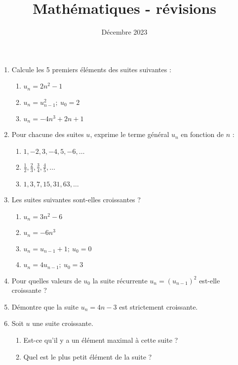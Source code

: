 

\title{Mathématiques - révisions}
\date{Décembre 2023}



	\maketitle

	\begin{enumerate}
		\item Calcule les 5 premiers éléments des suites suivantes :
		\begin{enumerate}
			\item $u_n = 2n^2 - 1$
			\item $u_n = u_{n-1}^2; ~ u_0 = 2$
			\item $u_n = -4n^3 + 2n + 1$
		\end{enumerate}
	
		\item Pour chacune des suites $u$, exprime le terme général $u_n$ en fonction de $n$ :
			\begin{enumerate}
				\item $1, -2, 3, -4, 5, -6, \dots$
				\item $\frac{1}{2}, \frac{2}{3}, \frac{3}{4}, \frac{4}{5}, \dots$
				\item $1, 3, 7, 15, 31, 63, \dots$
			\end{enumerate}
	
		\item Les suites suivantes sont-elles croissantes ?
			\begin{enumerate}
				\item $u_n = 3n^2 - 6$
				\item $u_n = -6n^3$
				\item $u_n = u_{n-1} + 1; ~u_0 = 0$
				\item $u_n = 4u_{n-1}; ~u_0 = 3$
			\end{enumerate}
		
		\item Pour quelles valeurs de $u_0$ la suite récurrente $u_n = \left(u_{n-1}\right)^2$ est-elle croissante ?
		
		\item Démontre que la suite $u_n = 4n - 3$ est strictement croissante.
		
		\item Soit $u$ une suite croissante. 
			\begin{enumerate}
				\item Est-ce qu'il y a un élément maximal à cette suite ?
				\item Quel est le plus petit élément de la suite ?
			\end{enumerate}
		

\end{enumerate}
